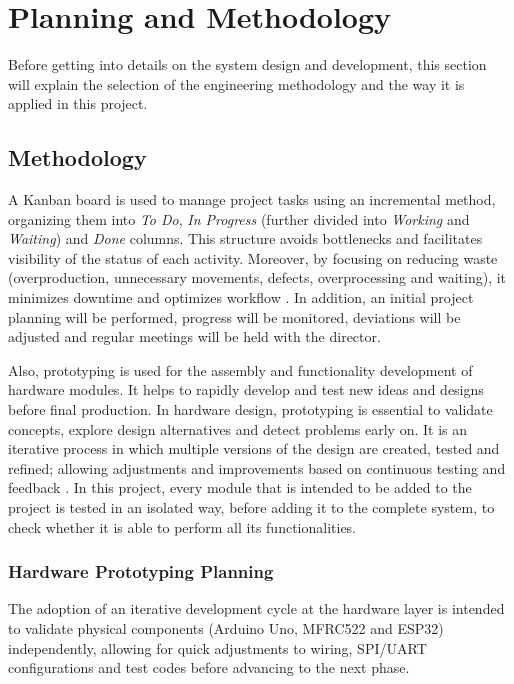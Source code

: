 \chapter{Planning and Methodology}

Before getting into details on the system design and development, this section will explain the selection of the engineering methodology and the way it is applied in this project.

\section{Methodology}

A Kanban board is used to manage project tasks using an incremental method, organizing them into \textit{To Do}, \textit{In Progress} (further divided into \textit{Working} and \textit{Waiting}) and \textit{Done} columns. This structure avoids bottlenecks and facilitates visibility of the status of each activity. Moreover, by focusing on reducing waste (overproduction, unnecessary movements, defects, overprocessing and waiting), it minimizes downtime and optimizes workflow \cite{ref43}. In addition, an initial project planning will be performed, progress will be monitored, deviations will be adjusted and regular meetings will be held with the director.

Also, prototyping is used for the assembly and functionality development of hardware modules. It helps to rapidly develop and test new ideas and designs before final production. In hardware design, prototyping is essential to validate concepts, explore design alternatives and detect problems early on. It is an iterative process in which multiple versions of the design are created, tested and refined; allowing adjustments and improvements based on continuous testing and feedback \cite{ref44}. In this project, every module that is intended to be added to the project is tested in an isolated way, before adding it to the complete system, to check whether it is able to perform all its functionalities.

\subsection{Hardware Prototyping Planning}

The adoption of an iterative development cycle at the hardware layer is intended to validate physical components (Arduino Uno, MFRC522 and ESP32) independently, allowing for quick adjustments to wiring, SPI/UART configurations and test codes before advancing to the next phase.

